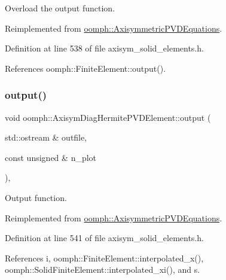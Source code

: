 Overload the output function. 



Reimplemented from \hyperlink{classoomph_1_1AxisymmetricPVDEquations_a70c01efa665238ec7a574588209d3edb}{oomph\+::\+Axisymmetric\+P\+V\+D\+Equations}.



Definition at line 538 of file axisym\+\_\+solid\+\_\+elements.\+h.



References oomph\+::\+Finite\+Element\+::output().

\mbox{\label{classoomph_1_1AxisymDiagHermitePVDElement_af5a83e5da70d404bc5e158704d757b56}} 
\subsubsection{\texorpdfstring{output()}{output()}\hspace{0.1cm}{\footnotesize\ttfamily [2/4]}}
{\footnotesize\ttfamily void oomph\+::\+Axisym\+Diag\+Hermite\+P\+V\+D\+Element\+::output (\begin{DoxyParamCaption}\item[{std\+::ostream \&}]{outfile,  }\item[{const unsigned \&}]{n\+\_\+plot }\end{DoxyParamCaption})\hspace{0.3cm}{\ttfamily [inline]}, {\ttfamily [virtual]}}



Output function. 



Reimplemented from \hyperlink{classoomph_1_1AxisymmetricPVDEquations_a35cf174ca1692f817e3182166e22ef4b}{oomph\+::\+Axisymmetric\+P\+V\+D\+Equations}.



Definition at line 541 of file axisym\+\_\+solid\+\_\+elements.\+h.



References i, oomph\+::\+Finite\+Element\+::interpolated\+\_\+x(), oomph\+::\+Solid\+Finite\+Element\+::interpolated\+\_\+xi(), and s.

\mbox{\label{classoomph_1_1AxisymDiagHermitePVDElement_a96c36dd119e64e6afb19b813ecbf33b8}} 
